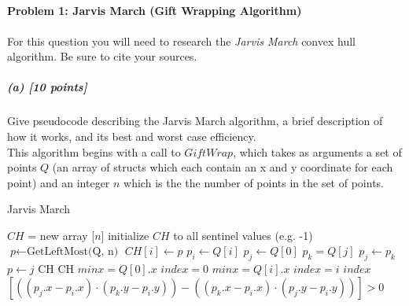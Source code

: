\documentclass[11pt]{article}
\title{\bf\textsl{} \\[2ex]
\rm\normalsize }
\date{}
\author{}
\begin{document}
\maketitle

\paragraph{Problem 1: Jarvis March (Gift Wrapping Algorithm)}
For this question you will need to research the {\em Jarvis March} convex hull algorithm. Be sure to cite your sources.
\subparagraph{(a) [10 points]}
Give pseudocode describing the Jarvis March algorithm, a brief description of how it works, and its best and worst case efficiency.\\

This algorithm begins with a call to $GiftWrap$, which takes as arguments a set of points $Q$ (an array of structs which each contain an x and y coordinate for each point) and an integer $n$ which is the the number of points in the set of points. 
\begin{algorithm}
\caption{Jarvis March}\label{euclid}
\begin{algorithmic}[1]
\EndIf
\State $CH$ = new array [$n$]
\State initialize $CH$ to all sentinel values (e.g. -1)
\State $\textit{p} \gets \text{GetLeftMost(Q, n)}$
\State $CH[i] \gets p$
\State $p_i \gets Q[i]$
\State $p_j \gets Q[0]$
\State $p_k = Q[j]$
\State $p_j \gets p_k$
\State $p\gets j$
\EndIf
\EndFor
{} \Return CH
\EndIf 
\EndFor
\Return CH
\EndProcedure
{}
\State $minx = Q[0].x$
\State $index = 0$
\State $minx = Q[i].x$
\State $index = i$
\EndIf
\EndFor
\Return $index$ 	
\EndProcedure
{}
\State
\Return $[((p_j.x-p_i.x)\cdot(p_k.y-p_i.y))-((p_k.x-p_i.x)\cdot(p_j.y-p_i.y))] > 0$
\EndProcedure
\end{algorithmic}
\end{algorithm}\\
\end{document}

